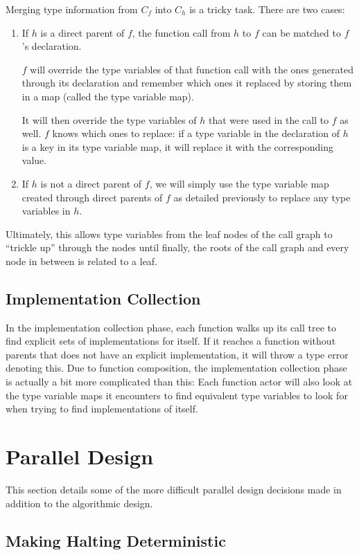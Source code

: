 \documentclass{acm_proc_article-sp}
\begin{document}
Merging type information from $C_f$ into $C_h$ is a tricky task. There are two
cases:
\begin{enumerate}
	\item If $h$ is a direct parent of $f$, the function call from $h$ to $f$
		can be matched to $f$'s declaration.

		$f$ will override the type
		variables of that function call with the ones generated through its
		declaration and remember which ones it replaced by storing them in a
		map (called the type variable map).

		It will then override the type variables of $h$ that were used in the
		call to $f$ as well. $f$ knows which ones to replace: if a type
		variable in the declaration of $h$ is a key in its type variable map,
		it will replace it with the corresponding value.
	\item If $h$ is not a direct parent of $f$, we will simply use the type
		variable map created through direct parents of $f$ as detailed
		previously to replace any type variables in $h$.
\end{enumerate}

Ultimately, this allows type variables from the leaf nodes of the call graph to
``trickle up'' through the nodes until finally, the roots of the call graph and
every node in between is related to a leaf.

\subsection{Implementation Collection}

In the implementation collection phase, each function walks up its call tree to
find explicit sets of implementations for itself. If it reaches a function
without parents that does not have an explicit implementation, it will throw a
type error denoting this. Due to function composition, the implementation
collection phase is actually a bit more complicated than this: Each function
actor will also look at the type variable maps it encounters to find equivalent
type variables to look for when trying to find implementations of itself.

\section{Parallel Design}
	This section details some of the more difficult parallel design decisions
	made in addition to the algorithmic design.

	\subsection{Making Halting Deterministic}
		\label{subsec:halting}
\end{document}
